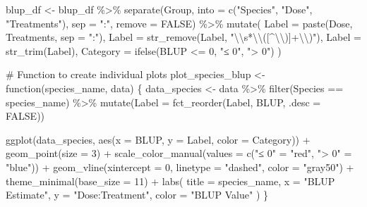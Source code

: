 \documentclass[
  10pt,
  letterpaper,
  twocolumn]{article}
\newenvironment{Shaded}{\begin{snugshade}}{\end{snugshade}}
\newcommand{\AttributeTok}[1]{\textcolor[rgb]{0.40,0.45,0.13}{#1}}
\newcommand{\CommentTok}[1]{\textcolor[rgb]{0.37,0.37,0.37}{#1}}
\newcommand{\ConstantTok}[1]{\textcolor[rgb]{0.56,0.35,0.01}{#1}}
\newcommand{\ControlFlowTok}[1]{\textcolor[rgb]{0.00,0.23,0.31}{#1}}
\newcommand{\DecValTok}[1]{\textcolor[rgb]{0.68,0.00,0.00}{#1}}
\newcommand{\FunctionTok}[1]{\textcolor[rgb]{0.28,0.35,0.67}{#1}}
\newcommand{\NormalTok}[1]{\textcolor[rgb]{0.00,0.23,0.31}{#1}}
\newcommand{\OtherTok}[1]{\textcolor[rgb]{0.00,0.23,0.31}{#1}}
\newcommand{\SpecialCharTok}[1]{\textcolor[rgb]{0.37,0.37,0.37}{#1}}
\newcommand{\StringTok}[1]{\textcolor[rgb]{0.13,0.47,0.30}{#1}}
\begin{document}
\begin{Shaded}
\begin{Highlighting}[]
\NormalTok{blup\_df }\OtherTok{\textless{}{-}}\NormalTok{ blup\_df }\SpecialCharTok{\%\textgreater{}\%}
  \FunctionTok{separate}\NormalTok{(Group, }\AttributeTok{into =} \FunctionTok{c}\NormalTok{(}\StringTok{"Species"}\NormalTok{, }\StringTok{"Dose"}\NormalTok{, }\StringTok{"Treatments"}\NormalTok{), }\AttributeTok{sep =} \StringTok{":"}\NormalTok{, }\AttributeTok{remove =} \ConstantTok{FALSE}\NormalTok{) }\SpecialCharTok{\%\textgreater{}\%}
  \FunctionTok{mutate}\NormalTok{(}
    \AttributeTok{Label =} \FunctionTok{paste}\NormalTok{(Dose, Treatments, }\AttributeTok{sep =} \StringTok{":"}\NormalTok{),}
    \AttributeTok{Label =} \FunctionTok{str\_remove}\NormalTok{(Label, }\StringTok{"}\SpecialCharTok{\textbackslash{}\textbackslash{}}\StringTok{s*}\SpecialCharTok{\textbackslash{}\textbackslash{}}\StringTok{([\^{}}\SpecialCharTok{\textbackslash{}\textbackslash{}}\StringTok{)]+}\SpecialCharTok{\textbackslash{}\textbackslash{}}\StringTok{)"}\NormalTok{),}
    \AttributeTok{Label =} \FunctionTok{str\_trim}\NormalTok{(Label),}
    \AttributeTok{Category =} \FunctionTok{ifelse}\NormalTok{(BLUP }\SpecialCharTok{\textless{}=} \DecValTok{0}\NormalTok{, }\StringTok{"≤ 0"}\NormalTok{, }\StringTok{"\textgreater{} 0"}\NormalTok{)}
\NormalTok{  )}

\CommentTok{\# Function to create individual plots}
\NormalTok{plot\_species\_blup }\OtherTok{\textless{}{-}} \ControlFlowTok{function}\NormalTok{(species\_name, data) \{}
\NormalTok{  data\_species }\OtherTok{\textless{}{-}}\NormalTok{ data }\SpecialCharTok{\%\textgreater{}\%}
    \FunctionTok{filter}\NormalTok{(Species }\SpecialCharTok{==}\NormalTok{ species\_name) }\SpecialCharTok{\%\textgreater{}\%}
    \FunctionTok{mutate}\NormalTok{(}\AttributeTok{Label =} \FunctionTok{fct\_reorder}\NormalTok{(Label, BLUP, }\AttributeTok{.desc =} \ConstantTok{FALSE}\NormalTok{))}
  
  \FunctionTok{ggplot}\NormalTok{(data\_species, }\FunctionTok{aes}\NormalTok{(}\AttributeTok{x =}\NormalTok{ BLUP, }\AttributeTok{y =}\NormalTok{ Label, }\AttributeTok{color =}\NormalTok{ Category)) }\SpecialCharTok{+}
    \FunctionTok{geom\_point}\NormalTok{(}\AttributeTok{size =} \DecValTok{3}\NormalTok{) }\SpecialCharTok{+}
    \FunctionTok{scale\_color\_manual}\NormalTok{(}\AttributeTok{values =} \FunctionTok{c}\NormalTok{(}\StringTok{"≤ 0"} \OtherTok{=} \StringTok{"red"}\NormalTok{, }\StringTok{"\textgreater{} 0"} \OtherTok{=} \StringTok{"blue"}\NormalTok{)) }\SpecialCharTok{+}
    \FunctionTok{geom\_vline}\NormalTok{(}\AttributeTok{xintercept =} \DecValTok{0}\NormalTok{, }\AttributeTok{linetype =} \StringTok{"dashed"}\NormalTok{, }\AttributeTok{color =} \StringTok{"gray50"}\NormalTok{) }\SpecialCharTok{+}
    \FunctionTok{theme\_minimal}\NormalTok{(}\AttributeTok{base\_size =} \DecValTok{11}\NormalTok{) }\SpecialCharTok{+}
    \FunctionTok{labs}\NormalTok{(}
      \AttributeTok{title =}\NormalTok{ species\_name,}
      \AttributeTok{x =} \StringTok{"BLUP Estimate"}\NormalTok{,}
      \AttributeTok{y =} \StringTok{"Dose:Treatment"}\NormalTok{,}
      \AttributeTok{color =} \StringTok{"BLUP Value"}
\NormalTok{    )}
\NormalTok{\}}


\end{Highlighting}
\end{Shaded}
\end{document}
